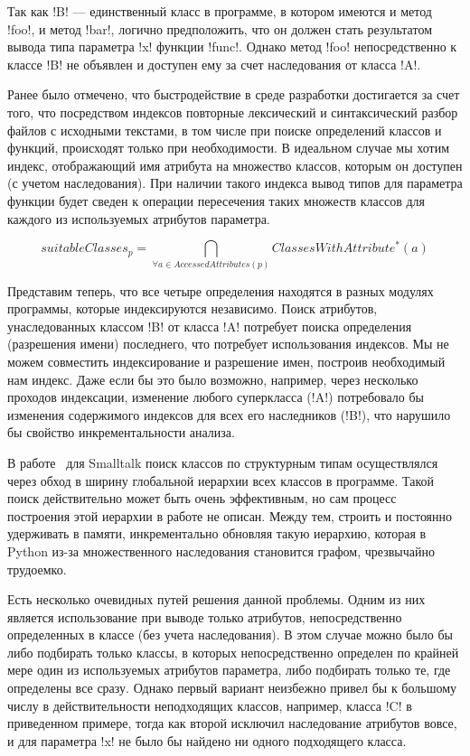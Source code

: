 Так как !B! --- единственный класс в программе, в котором имеются и метод
!foo!, и метод !bar!, логично предположить, что он должен стать
результатом вывода типа параметра !x!  функции !func!. Однако метод !foo!
непосредственно к классе !B!  не объявлен и доступен ему за счет
наследования от класса !A!. 

Ранее было отмечено, что быстродействие в среде
разработки достигается за счет того, что посредством индексов повторные
лексический и синтаксический разбор файлов с исходными текстами, в том числе при
поиске определений классов и функций, происходят только при необходимости. 
В идеальном случае мы хотим индекс, отображающий имя атрибута на множество
классов, которым он доступен (с учетом наследования). При наличии такого индекса
вывод типов для параметра функции будет сведен к операции пересечения таких множеств
классов для каждого из используемых атрибутов параметра.



\[
  suitableClasses_p = \bigcap\limits_{\forall{a} \in AccessedAttributes(p)}
  ClassesWithAttribute^*(a)
\]

Представим теперь, что все четыре определения находятся в разных модулях
программы, которые индексируются независимо. Поиск атрибутов, унаследованных
классом !B! от класса !A! потребует поиска определения (разрешения имени) последнего, 
что потребует использования индексов. Мы не можем совместить
индексирование и разрешение имен, построив необходимый нам индекс. Даже если бы
это было возможно, например, через несколько проходов
индексации, изменение любого суперкласса (!A!) потребовало бы изменения
содержимого индексов для всех его наследников (!B!), что
нарушило бы свойство инкрементальности анализа.

В работе~\cite{Pluquet2009} для Smalltalk поиск классов по структурным типам осуществлялся
через обход в ширину глобальной иерархии всех классов в программе. Такой поиск
действительно может быть очень эффективным, но сам процесс построения этой
иерархии в работе не описан. Между тем, строить и постоянно удерживать в памяти,
инкрементально обновляя такую иерархию, которая в Python из-за множественного
наследования становится графом, чрезвычайно трудоемко.

Есть несколько очевидных путей решения данной проблемы. Одним из них является
использование при выводе только атрибутов, непосредственно определенных в классе
(без учета наследования). В этом случае можно было бы либо подбирать только
классы, в которых непосредственно определен по крайней мере один из используемых
атрибутов параметра, либо подбирать только те, где определены все сразу. Однако
первый вариант неизбежно привел бы к большому числу в действительности
неподходящих классов, например, класса !C! в приведенном примере, тогда как второй
исключил наследование атрибутов вовсе, и для параметра !x! не было бы
найдено ни одного подходящего класса.

